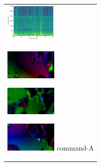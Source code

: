 \begin{figure}[htbp]
\begin{tabular}{l}
\begin{minipage}{0.165\hsize}
\begin{center}
        \end{center}
      \end{minipage}
      \begin{minipage}{0.165\hsize}
        \begin{center}
          \includegraphics[clip, width=2.5cm]{./Figures/sound_commandmatemate.eps}
        \end{center}
      \end{minipage}
\\  %
      \begin{minipage}{0.165\hsize}
        \begin{center}
          \includegraphics[clip, width=2.5cm]{./Figures/optic_commandmatemate1.eps}
          \hspace{0.3cm} { }
        \end{center}
      \end{minipage}
      \begin{minipage}{0.165\hsize}
        \begin{center}
          \includegraphics[clip, width=2.5cm]{./Figures/optic_commandmatemate2.eps}
          \hspace{0.0cm} { }
        \end{center}
      \end{minipage}
      \begin{minipage}{0.165\hsize}
        \begin{center}
          \includegraphics[clip, width=2.5cm]{./Figures/optic_commandmatemate3.eps}
          \hspace{0.0cm} {command-A}
        \end{center}
      \end{minipage}

\end{tabular}
\end{figure}
